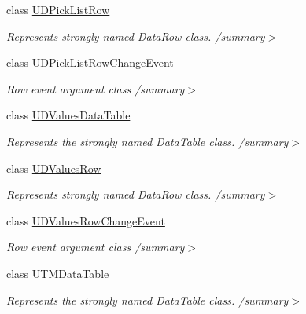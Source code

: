\begin{DoxyCompactItemize}
class \hyperlink{class_env_int_1_1_win32_1_1_field_tech_1_1_manager_1_1_data_sets_1_1_guide_ware_mobile_data_set_1_1_u_d_pick_list_row}{U\+D\+Pick\+List\+Row}
\begin{DoxyCompactList}\small\item\em Represents strongly named Data\+Row class. /summary$>$ \end{DoxyCompactList}\item 
class \hyperlink{class_env_int_1_1_win32_1_1_field_tech_1_1_manager_1_1_data_sets_1_1_guide_ware_mobile_data_set_a32762a7487696410a34ea07d27caf21}{U\+D\+Pick\+List\+Row\+Change\+Event}
\begin{DoxyCompactList}\small\item\em Row event argument class /summary$>$ \end{DoxyCompactList}\item 
class \hyperlink{class_env_int_1_1_win32_1_1_field_tech_1_1_manager_1_1_data_sets_1_1_guide_ware_mobile_data_set_1_1_u_d_values_data_table}{U\+D\+Values\+Data\+Table}
\begin{DoxyCompactList}\small\item\em Represents the strongly named Data\+Table class. /summary$>$ \end{DoxyCompactList}\item 
class \hyperlink{class_env_int_1_1_win32_1_1_field_tech_1_1_manager_1_1_data_sets_1_1_guide_ware_mobile_data_set_1_1_u_d_values_row}{U\+D\+Values\+Row}
\begin{DoxyCompactList}\small\item\em Represents strongly named Data\+Row class. /summary$>$ \end{DoxyCompactList}\item 
class \hyperlink{class_env_int_1_1_win32_1_1_field_tech_1_1_manager_1_1_data_sets_1_1_guide_ware_mobile_data_set_1_1_u_d_values_row_change_event}{U\+D\+Values\+Row\+Change\+Event}
\begin{DoxyCompactList}\small\item\em Row event argument class /summary$>$ \end{DoxyCompactList}\item 
class \hyperlink{class_env_int_1_1_win32_1_1_field_tech_1_1_manager_1_1_data_sets_1_1_guide_ware_mobile_data_set_1_1_u_t_m_data_table}{U\+T\+M\+Data\+Table}
\begin{DoxyCompactList}\small\item\em Represents the strongly named Data\+Table class. /summary$>$ \end{DoxyCompactList}\item 

\end{DoxyCompactItemize}
